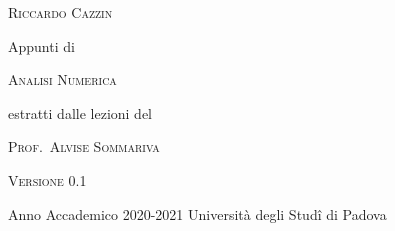 \documentclass[11pt]{report}
\theoremstyle{plain}
\theoremstyle{definition}
\theoremstyle{remark}
\numberwithin{equation}{chapter}
\numberwithin{figure}{chapter}
\numberwithin{table}{chapter}
\begin{document}
	\begin{titlepage}
		\begin{center}
			\begin{LARGE}
				\textsc{Riccardo Cazzin}
			\end{LARGE}
		\end{center}
		
		\vspace{4.5em}
		
		\begin{center}
			\begin{large}
				Appunti di
			\end{large}
			
			\vspace{1.8em}
			
			\begin{huge}
				\textsc{Analisi Numerica}
			\end{huge}
		\end{center}
		
		\vfill
		
		\begin{center}
			\begin{large}
				estratti dalle lezioni del
			\end{large}
			
			\vspace{1em}
			
			\begin{LARGE}
				\textsc{Prof.\ Alvise Sommariva}
			\end{LARGE}
		\end{center}
		
		\vfill
		
		\begin{center}
			\begin{large}
				\textsc{Versione 0.1}
			\end{large}
		\end{center}
		
		\vfill
		
		\noindent Anno Accademico 2020-2021 \hfill Università degli Studî di Padova
	\end{titlepage}
	
	\tableofcontents
	
	
	
	
	
	
	
\end{document}
